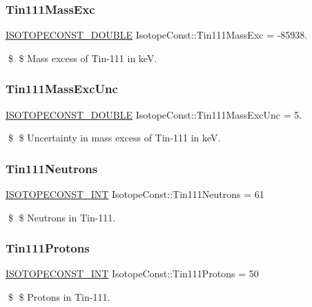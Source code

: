 \subsubsection{\texorpdfstring{Tin111\+Mass\+Exc}{Tin111MassExc}}
{\footnotesize\ttfamily \mbox{\hyperlink{group___isotope_const-_macros_ga8f45a7272ce02c0b4c65c44636ed719a}{I\+S\+O\+T\+O\+P\+E\+C\+O\+N\+S\+T\+\_\+\+D\+O\+U\+B\+LE}} Isotope\+Const\+::\+Tin111\+Mass\+Exc = -\/85938.}

\$ \$ Mass excess of Tin-\/111 in keV. \mbox{\label{group___isotope_const-_tin-_sn111_gaeb0e9be3771ffe1d7a0601207db0cc1d}} 
\subsubsection{\texorpdfstring{Tin111\+Mass\+Exc\+Unc}{Tin111MassExcUnc}}
{\footnotesize\ttfamily \mbox{\hyperlink{group___isotope_const-_macros_ga8f45a7272ce02c0b4c65c44636ed719a}{I\+S\+O\+T\+O\+P\+E\+C\+O\+N\+S\+T\+\_\+\+D\+O\+U\+B\+LE}} Isotope\+Const\+::\+Tin111\+Mass\+Exc\+Unc = 5.}

\$ \$ Uncertainty in mass excess of Tin-\/111 in keV. \mbox{\label{group___isotope_const-_tin-_sn111_ga6d0bf4e1b77f0a058efe02e08d6591f8}} 
\subsubsection{\texorpdfstring{Tin111\+Neutrons}{Tin111Neutrons}}
{\footnotesize\ttfamily \mbox{\hyperlink{group___isotope_const-_macros_ga5f18360b3e99483a35c32d789e62621c}{I\+S\+O\+T\+O\+P\+E\+C\+O\+N\+S\+T\+\_\+\+I\+NT}} Isotope\+Const\+::\+Tin111\+Neutrons = 61}

\$ \$ Neutrons in Tin-\/111. \mbox{\label{group___isotope_const-_tin-_sn111_ga1412dec0bae39296332cf1b7908ee4ff}} 
\subsubsection{\texorpdfstring{Tin111\+Protons}{Tin111Protons}}
{\footnotesize\ttfamily \mbox{\hyperlink{group___isotope_const-_macros_ga5f18360b3e99483a35c32d789e62621c}{I\+S\+O\+T\+O\+P\+E\+C\+O\+N\+S\+T\+\_\+\+I\+NT}} Isotope\+Const\+::\+Tin111\+Protons = 50}

\$ \$ Protons in Tin-\/111. 